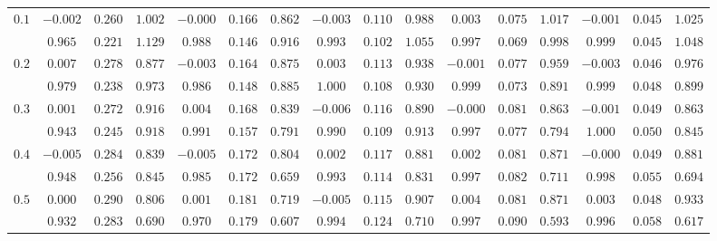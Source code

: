 \begin{table}
\begin{center}
\begin{tabular}{|c|ccc|ccc|ccc|ccc|ccc|}
\hline 
$0.1$ & $ -0.002 $ & $ 0.260 $ & $ 1.002 $ & $ -0.000 $ & $ 0.166 $ & $ 0.862 $ & $ -0.003 $ & $ 0.110 $ & $ 0.988 $ & $ 0.003 $ & $ 0.075 $ & $ 1.017 $ & $ -0.001 $ & $ 0.045 $ & $ 1.025 $\\ 
 & $ 0.965 $ & $ 0.221 $ & $ 1.129 $ & $ 0.988 $ & $ 0.146 $ & $ 0.916 $ & $ 0.993 $ & $ 0.102 $ & $ 1.055 $ & $ 0.997 $ & $ 0.069 $ & $ 0.998 $ & $ 0.999 $ & $ 0.045 $ & $ 1.048 $\\ 
\hline 
$0.2$ & $ 0.007 $ & $ 0.278 $ & $ 0.877 $ & $ -0.003 $ & $ 0.164 $ & $ 0.875 $ & $ 0.003 $ & $ 0.113 $ & $ 0.938 $ & $ -0.001 $ & $ 0.077 $ & $ 0.959 $ & $ -0.003 $ & $ 0.046 $ & $ 0.976 $\\ 
 & $ 0.979 $ & $ 0.238 $ & $ 0.973 $ & $ 0.986 $ & $ 0.148 $ & $ 0.885 $ & $ 1.000 $ & $ 0.108 $ & $ 0.930 $ & $ 0.999 $ & $ 0.073 $ & $ 0.891 $ & $ 0.999 $ & $ 0.048 $ & $ 0.899 $\\ 
\hline 
$0.3$ & $ 0.001 $ & $ 0.272 $ & $ 0.916 $ & $ 0.004 $ & $ 0.168 $ & $ 0.839 $ & $ -0.006 $ & $ 0.116 $ & $ 0.890 $ & $ -0.000 $ & $ 0.081 $ & $ 0.863 $ & $ -0.001 $ & $ 0.049 $ & $ 0.863 $\\ 
 & $ 0.943 $ & $ 0.245 $ & $ 0.918 $ & $ 0.991 $ & $ 0.157 $ & $ 0.791 $ & $ 0.990 $ & $ 0.109 $ & $ 0.913 $ & $ 0.997 $ & $ 0.077 $ & $ 0.794 $ & $ 1.000 $ & $ 0.050 $ & $ 0.845 $\\ 
\hline 
$0.4$ & $ -0.005 $ & $ 0.284 $ & $ 0.839 $ & $ -0.005 $ & $ 0.172 $ & $ 0.804 $ & $ 0.002 $ & $ 0.117 $ & $ 0.881 $ & $ 0.002 $ & $ 0.081 $ & $ 0.871 $ & $ -0.000 $ & $ 0.049 $ & $ 0.881 $\\ 
 & $ 0.948 $ & $ 0.256 $ & $ 0.845 $ & $ 0.985 $ & $ 0.172 $ & $ 0.659 $ & $ 0.993 $ & $ 0.114 $ & $ 0.831 $ & $ 0.997 $ & $ 0.082 $ & $ 0.711 $ & $ 0.998 $ & $ 0.055 $ & $ 0.694 $\\ 
\hline 
$0.5$ & $ 0.000 $ & $ 0.290 $ & $ 0.806 $ & $ 0.001 $ & $ 0.181 $ & $ 0.719 $ & $ -0.005 $ & $ 0.115 $ & $ 0.907 $ & $ 0.004 $ & $ 0.081 $ & $ 0.871 $ & $ 0.003 $ & $ 0.048 $ & $ 0.933 $\\ 
 & $ 0.932 $ & $ 0.283 $ & $ 0.690 $ & $ 0.970 $ & $ 0.179 $ & $ 0.607 $ & $ 0.994 $ & $ 0.124 $ & $ 0.710 $ & $ 0.997 $ & $ 0.090 $ & $ 0.593 $ & $ 0.996 $ & $ 0.058 $ & $ 0.617 $\\ 
\hline 

\end{tabular}
\end{center}
\end{table}
